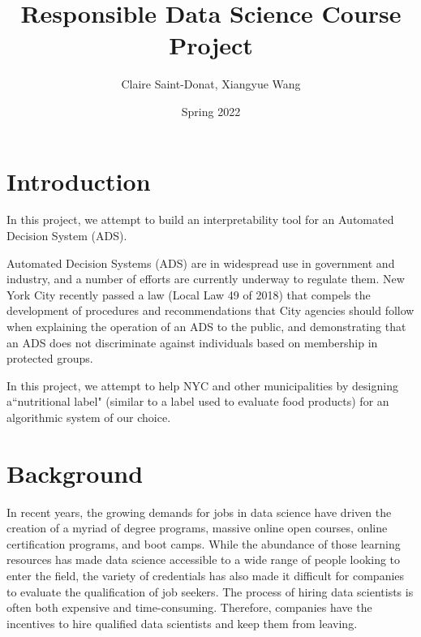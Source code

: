 \documentclass[11pt]{article}
\title{Responsible Data Science Course Project}
\author{Claire Saint-Donat, Xiangyue Wang}
\affil{Center for Data Science, New York University}
\date{Spring 2022}
\begin{document}
\maketitle
\tableofcontents

\section{Introduction}

In this project, we attempt to build an interpretability tool for an Automated Decision System (ADS). 

Automated Decision Systems (ADS) are in widespread use in government and industry, and a number of efforts are currently underway to regulate them.  New York City recently passed a law (Local Law 49 of 2018) that compels the development of procedures and recommendations that City agencies should follow when explaining the operation of an ADS to the public, and demonstrating that an ADS does not discriminate against individuals based on membership in protected groups.  

In this project, we attempt to help NYC and other municipalities by designing a``nutritional label" (similar to a label used to evaluate food products) for an algorithmic system of our choice. 
\pagebreak

\section{Background}
In recent years, the growing demands for jobs in data science have driven the creation of a myriad of degree programs, massive online open courses, online certification programs, and boot camps. While the abundance of those learning resources has made data science accessible to a wide range of people looking to enter the field, the variety of credentials has also made it difficult for companies to evaluate the qualification of job seekers. The process of hiring data scientists is often both expensive and time-consuming. Therefore, companies have the incentives to hire qualified data scientists and keep them from leaving. 
\end{document}
